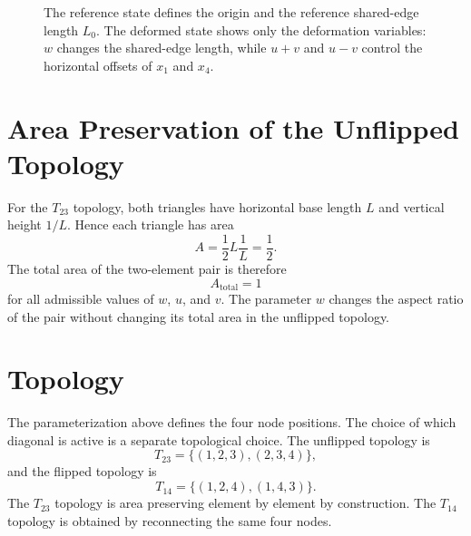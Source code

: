 \documentclass[11pt]{article}
\begin{document}
\begin{figure}[ht]
    \caption{
        The reference state defines the origin and the reference shared-edge
        length \(L_0\). The deformed state shows only the deformation
        variables: \(w\) changes the shared-edge length, while \(u+v\) and
        \(u-v\) control the horizontal offsets of \(x_1\) and \(x_4\).
    }
    \label{fig:wuv-parameterization}
\end{figure}

\section{Area Preservation of the Unflipped Topology}

For the \(T_{23}\) topology, both triangles have horizontal base length
\(L\) and vertical height \(1/L\). Hence each triangle has area
\[
    A = \frac{1}{2} L\frac{1}{L} = \frac{1}{2}.
\]
The total area of the two-element pair is therefore
\[
    A_{\mathrm{total}}=1
\]
for all admissible values of \(w\), \(u\), and \(v\). The parameter \(w\)
changes the aspect ratio of the pair without changing its total area in the
unflipped topology.

\section{Topology}

The parameterization above defines the four node positions. The choice of
which diagonal is active is a separate topological choice. The unflipped
topology is
\[
    T_{23}=\{(1,2,3),(2,3,4)\},
\]
and the flipped topology is
\[
    T_{14}=\{(1,2,4),(1,4,3)\}.
\]
The \(T_{23}\) topology is area preserving element by element by construction.
The \(T_{14}\) topology is obtained by reconnecting the same four nodes.
\end{document}
